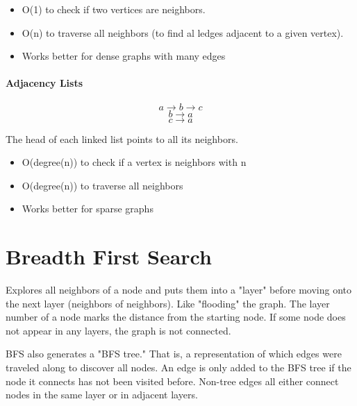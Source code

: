 \begin{itemize}
    \item O(1) to check if two vertices are neighbors.
    \item O(n) to traverse all neighbors (to find al ledges adjacent to a given vertex).
    \item Works better for dense graphs with many edges
\end{itemize}


\paragraph{Adjacency Lists}

\[a \rightarrow b \rightarrow c\]
\[b \rightarrow a \]
\[c \rightarrow a\]

The head of each linked list points to all its neighbors.

\begin{itemize}
    \item O(degree(n)) to check if a vertex is neighbors with n
    \item O(degree(n)) to traverse all neighbors
    \item Works better for sparse graphs
\end{itemize}

\section{Breadth First Search}
Explores all neighbors of a node and puts them into a "layer" before moving onto the next layer (neighbors of neighbors). Like "flooding" the graph. The layer number of a node marks the distance from the starting node. If some node does not appear in any layers, the graph is not connected.

BFS also generates a "BFS tree." That is, a representation of which edges were traveled along to discover all nodes. An edge is only added to the BFS tree if the node it connects has not been visited before. Non-tree edges all either connect nodes in the same layer or in adjacent layers.

